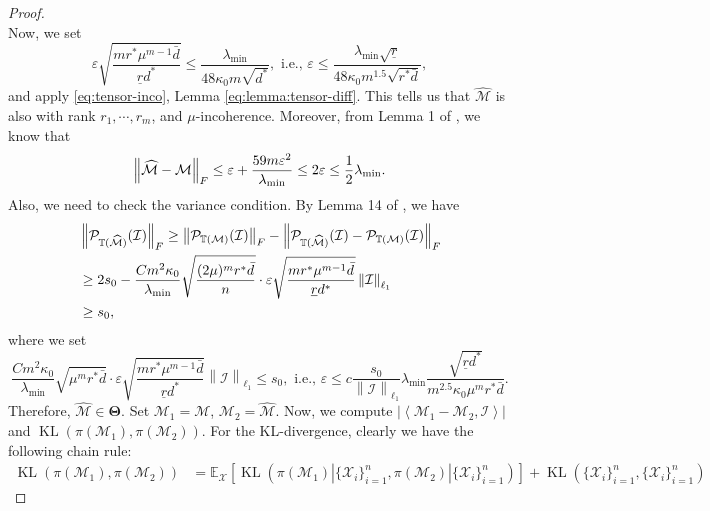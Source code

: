 \documentclass[12pt]{article}
\newcommand{\tF}{{\rm F}}
\newcommand{\abs}[1]{\left\lvert#1\right\rvert}
\newcommand{\norm}[1]{\left\lVert#1\right\rVert}
\newcommand{\E}{\mathbb{E}}
\newcommand{\cP}{\mathcal{P}}
\newcommand{\cM}{\mathcal{M}}
\newcommand{\cI}{\mathcal{I}}
\newcommand{\cX}{\mathcal{X}}
\def\TT{{\mathbb T}}
\newcommand{\dmax}{\bar{d}}
\theoremstyle{plain}
\begin{document}
\begin{proof}
\begin{equation*}
\end{equation*}
Now, we set 
\begin{equation}\label{eq:minimax-eps-1}
    \varepsilon\sqrt{\frac{mr^*\mu^{m-1}\dmax}{\underline{r}d^*}} \le \frac{\lambda_{\min}}{48\kappa_0 m\sqrt{d^*}}, \text{ i.e., } \varepsilon \le \frac{\lambda_{\min}\sqrt{\underline{r}}}{48\kappa_0 m^{1.5 }\sqrt{r^* \dmax}},
\end{equation}
and apply \eqref{eq:tensor-inco}, Lemma \ref{eq:lemma:tensor-diff}. This tells us that $ \widehat{\cM} $ is also with rank $r_1,\cdots,r_m$, and $\mu$-incoherence. Moreover, from Lemma 1 of \cite{li2023online}, we know that
\begin{equation*}
    \norm{\widehat{\cM}-\cM}_{\tF}\le \varepsilon + \frac{59 m\varepsilon^2}{\lambda_{\min}} \le 2\varepsilon\le \frac{1}{2}\lambda_{\min}.
\end{equation*}
Also, we need to check the variance condition. By Lemma 14 of \cite{ma2024statistical}, we have
\begin{equation*}
\begin{aligned}
        &\norm{\cP_{\TT(\widehat{\cM})}(\cI)}_{\tF}\ge   \norm{\cP_{\TT({\cM})}(\cI)}_{\tF} -\norm{\cP_{\TT(\widehat{\cM})}(\cI)-\cP_{\TT({\cM})}(\cI)}_{\tF}  
         \\
    & \ge 2 s_0 - \frac{C  m^2\kappa_0   }{\lambda_{\min}}\sqrt{\frac{(2\mu)^m r^*\dmax }{n}}\cdot\varepsilon\sqrt{\frac{mr^*\mu^{m-1}\dmax}{\underline{r}d^*}}\norm{\cI}_{\ell_1}
    \\
    & \ge s_0,
\end{aligned}
\end{equation*}
where we set
\begin{equation}\label{eq:minimax-eps-2}
    \frac{C  m^2\kappa_0   }{\lambda_{\min}}\sqrt{{\mu^m r^*\dmax } }\cdot\varepsilon\sqrt{\frac{mr^*\mu^{m-1}\dmax}{\underline{r}d^*}}\norm{\cI}_{\ell_1} \le s_0, \text{ i.e., } \varepsilon \le  c\frac{s_0}{\norm{\cI}_{\ell_1}} \lambda_{\min} \frac{\sqrt{\underline{r}  d^*}}{m^{2.5}\kappa_0\mu^m r^* \dmax}.
\end{equation}
Therefore, ${\widehat{\cM}}\in\boldsymbol{\Theta}$. Set $\cM_1=\cM$, $\cM_2=\widehat{\cM}$. Now, we compute $\abs{\left\langle \cM_1-\cM_2,\cI\right\rangle}$ and $\operatorname{KL}(\pi(\cM_1),\pi(\cM_2))$. For the KL-divergence, clearly we have the following chain rule:
\begin{equation*}
\begin{aligned}
        \operatorname{KL}(\pi(\cM_1),\pi(\cM_2)) & = \E_{\cX}[\operatorname{KL}(\pi(\cM_1)|\{\cX_i\}_{i=1}^n,\pi(\cM_2)|\{\cX_i\}_{i=1}^n)  ] + \operatorname{KL}(\{\cX_i\}_{i=1}^n,\{\cX_i\}_{i=1}^n) 

\end{aligned}
\end{equation*}
\end{proof}
\end{document}
